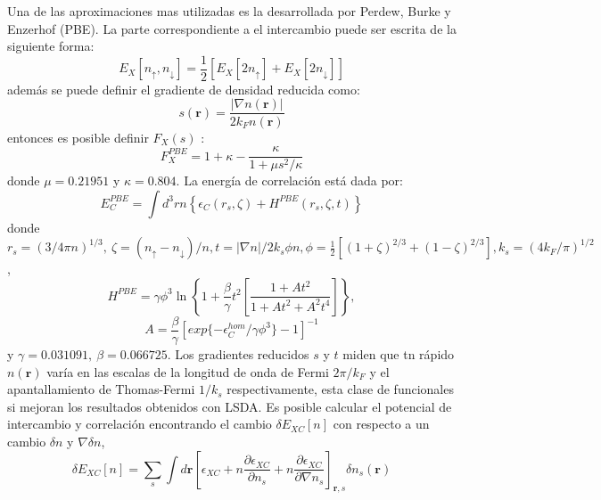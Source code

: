 \documentclass[12pt,a4paper, oneside]{book}
\begin{document}
   \newline
   Una de las aproximaciones mas utilizadas es la desarrollada por Perdew, Burke y Enzerhof (PBE). La parte correspondiente a el intercambio puede ser escrita de la siguiente forma:
   \begin{equation}
   E_X [n_{\uparrow}, n_{\downarrow}]= \frac{1}{2} \left[E_{X} [2 n_{\uparrow}] + E_{X} [2 n_{\downarrow}]   \right] \label{ec:divEx}
   \end{equation}
   adem\'as se puede definir el gradiente de densidad reducida como:
   \begin{equation}
   s(\pmb{r})= \frac{|\nabla n (\pmb{r})|}{2 k_F n (\pmb{r}) } \label{ec:S}
   \end{equation}
   entonces es posible definir  $F_X (s)$ :
   \begin{equation}
   F_{X}^{PBE} = 1+\kappa -\frac{\kappa}{1+\mu s^2 /\kappa} \label{ec:F_X-PBE}
   \end{equation}
   donde $\mu = 0.21951 $ y $\kappa= 0.804 $. La energ\'ia de correlaci\'on est\'a dada por:
   \begin{equation}
   E_{C} ^{PBE} = \int d^3 r n \left\{\epsilon_{C}(r_s,\zeta)+ H^{PBE} (r_s,\zeta,t) \right\}\label{ec:funcCorr}
   \end{equation}
   donde $r_s = (3/4 \pi n)^{1/3}, ~ \zeta =(n_{\uparrow}-n_{\downarrow})/n, t=|\nabla n|/2 k_s \phi n, \phi= \frac{1}{2} [(1+\zeta)^{2/3}+(1-\zeta)^{2/3}], k_s = (4 k_F/\pi)^{1/2}$,
   \begin{equation}
   H^{PBE} = \gamma \phi^3 \ln \left\{1+ \frac{\beta}{\gamma} t^2 \left[\frac{1+At^2}{1+At^2+A^2 t^4}\right]\right\}, \label{ec:PBEH}
   \end{equation}
   \begin{equation}
   A=\frac{\beta}{\gamma} [exp\{-\epsilon_{C}^{hom}/\gamma \phi^3 \}-1]^{-1} \label{ec:A}
   \end{equation}
   y $\gamma=0.031091, ~\beta=0.066725$. Los gradientes reducidos $s$ y $t$ miden que tn r\'apido $n(\pmb{r})$ var\'ia en las escalas de la longitud de onda de Fermi $2\pi/k_F$ y el apantallamiento de Thomas-Fermi $1/k_s$ respectivamente, esta clase de funcionales si mejoran los resultados obtenidos con LSDA.
   \newline
   Es posible calcular el potencial de intercambio y correlaci\'on encontrando el cambio $\delta E_{XC} [n]$ con respecto a un cambio  $\delta n$ y $\nabla \delta n$,
   \begin{equation}
   \delta E_{XC} [n] = \sum_{s} \int d \pmb{r} \left[\epsilon_{XC} + n \frac{\partial \epsilon_{XC}}{\partial n_s} + n \frac{\partial \epsilon_{XC}}{\partial \nabla n_s} \right]_{\pmb{r},s} \delta n_s(\pmb{r}) \label{ec:ecpotVXC_1}
   \end{equation}
\end{document}
